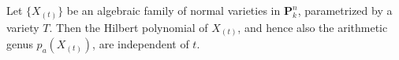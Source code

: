 Let $\{X_{(t)}\}$ be an algebraic family of normal varieties in $\mathbf{P}_k^n$, parametrized by a variety $T$. Then the Hilbert polynomial of $X_{(t)}$, and hence also the arithmetic genus $p_a(X_{(t)})$, are independent of $t$.
